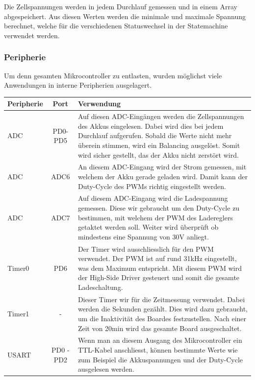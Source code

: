 Die Zellspannungen werden in jedem Durchlauf gemessen und in einem Array abgespeichert. Aus diesen Werten werden die minimale und maximale Spannung berechnet, welche für die verschiedenen Statuswechsel in der Statemachine verwendet werden.

\subsubsection*{Peripherie}
Um denn gesamten Mikrocontroller zu entlasten, wurden möglichst viele Anwendungen in interne Peripherien ausgelagert. \\
\begin{tabularx}{\textwidth}{l|c|X}
	Peripherie & Port & Verwendung \\ \hline
	ADC &
	PD0-PD5 &
	Auf diesen ADC-Eingängen werden die Zellspannungen des Akkus eingelesen. Dabei wird dies bei jedem Durchlauf aufgerufen. Sobald die Werte nicht mehr überein stimmen, wird ein Balancing ausgelöst. Somit wird sicher gestellt, das der Akku nicht zerstört wird.
	\\ \hline
	ADC &
	ADC6 &
	An diesem ADC-Eingang wird der Strom gemessen, mit welchem der Akku gerade geladen wird. Damit kann der Duty-Cycle des PWMs richtig eingestellt werden.
	\\ \hline
	ADC &
	ADC7 &
	Auf diesem ADC-Eingang wird die Ladespannung gemessen. Diese wir gebraucht um den Duty-Cycle zu bestimmen, mit welchem der PWM des Ladereglers getaktet werden soll. Weiter wird überprüft ob mindestens eine Spannung von 30V anliegt.
	\\ \hline
	Timer0 &
	PD6 &
	Der Timer wird ausschliesslich für den PWM verwendet. Der PWM ist auf rund 31kHz eingestellt, was dem Maximum entspricht. Mit diesem PWM wird der High-Side Driver gesteuert und somit die gesamte Ladeschaltung. 
	\\ \hline
	Timer1 &
	- &
	Dieser Timer wir für die Zeitmessung verwendet. Dabei werden die Sekunden gezählt. Dies wird dazu gebraucht, um die Inaktivität des Boardes festzustellen. Nach einer Zeit von 20min wird das gesamte Board ausgeschaltet. 
	\\ \hline
	USART &
	PD0 - PD2 &
	Wenn man an diesem Ausgang des Mikrocontroller ein TTL-Kabel anschliesst, können bestimmte Werte wie zum Beispiel die Akkuspannungen und der Duty-Cycle ausgelesen werden.
	\\ \hline
\end{tabularx}
\label{tab:peripherieBM}


